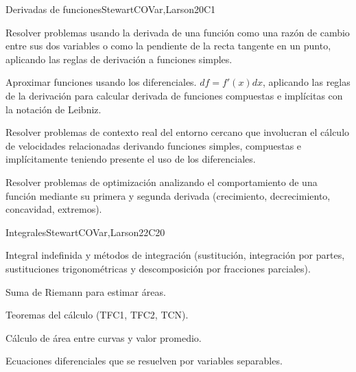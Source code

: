 \begin{syllabus}
\begin{unit}{Derivadas de funciones}{}{StewartCOVar,Larson}{20}{C1}
   \begin{learningoutcomes}
      \item Resolver problemas usando la derivada de una función como una razón de cambio entre sus dos variables o como la pendiente de la recta tangente en un punto, aplicando las reglas de derivación a funciones simples. 
      \item Aproximar funciones usando los diferenciales. $df=f'(x)dx$, aplicando las reglas de la derivación para calcular derivada de funciones compuestas e implícitas con la notación de Leibniz.
      \item Resolver problemas de contexto real del entorno cercano que involucran el cálculo de velocidades relacionadas derivando funciones simples, compuestas e implícitamente teniendo presente el uso de los diferenciales.
      \item Resolver problemas de optimización analizando el comportamiento de una función mediante su primera y segunda derivada (crecimiento, decrecimiento, concavidad, extremos).
   \end{learningoutcomes}
\end{unit}

\begin{unit}{Integrales}{}{StewartCOVar,Larson}{22}{C20}
   \begin{topics}
      \item Integral indefinida y métodos de integración (sustitución, integración por partes, sustituciones trigonométricas y descomposición por fracciones parciales).
      \item Suma de Riemann para estimar áreas.
      \item Teoremas del cálculo (TFC1, TFC2, TCN).
      \item Cálculo de área entre curvas y valor promedio.
      \item Ecuaciones diferenciales que se resuelven por variables separables.
   \end{topics}


\end{unit}
\end{syllabus}

